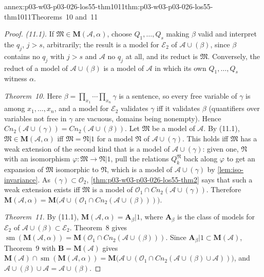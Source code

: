\begin{annexitem}{annex:p03-w03-p03-026-los55-thm1011}{thm:p03-w03-p03-026-los55-thm1011}{Theorems~10 and~11}
\begin{proof}
\emph{(11.1).}  If \(\mathfrak M\in\mathbf M(\mathcal A,\alpha)\), choose
\(Q_1,\ldots,Q_s\) making \(\beta\) valid and interpret the \(q_j\), \(j>s\),
arbitrarily; the result is a model for \(\mathcal E_2\) of
\(\mathcal A\cup(\beta)\), since \(\beta\) contains no \(q_j\) with \(j>s\)
and \(\mathcal A\) no \(q_j\) at all, and its reduct is \(\mathfrak M\).
Conversely, the reduct of a model of \(\mathcal A\cup(\beta)\) is a model of
\(\mathcal A\) in which its own \(Q_1,\ldots,Q_s\) witness \(\alpha\).

\emph{Theorem~10.}  Here \(\beta=\prod_{x_1}\cdots\prod_{x_n}\gamma\) is a
sentence, so every free variable of \(\gamma\) is among
\(x_1,\ldots,x_n\), and a model for \(\mathcal E_2\) validates \(\gamma\) iff
it validates \(\beta\) (quantifiers over variables not free in \(\gamma\)
are vacuous, domains being nonempty).  Hence
\(\mathit{Cn}_2(\mathcal A\cup(\gamma))=\mathit{Cn}_2(\mathcal A\cup(\beta))\).
Let \(\mathfrak M\) be a model of \(\mathcal A\).  By (11.1),
\(\mathfrak M\in\mathbf M(\mathcal A,\alpha)\) iff \(\mathfrak M=\mathfrak N|1\)
for a model \(\mathfrak N\) of \(\mathcal A\cup(\gamma)\).  This holds iff
\(\mathfrak M\) has a weak extension of the second kind that is a model of
\(\mathcal A\cup(\gamma)\): given one, \(\mathfrak N\) with an isomorphism
\(\varphi\colon\mathfrak M\to\mathfrak N|1\), pull the relations
\(Q_k^{\mathfrak N}\) back along \(\varphi\) to get an expansion of
\(\mathfrak M\) isomorphic to \(\mathfrak N\), which is a model of
\(\mathcal A\cup(\gamma)\) by \cref{lem:iso-invariance}.  As
\((\gamma)\subset\mathcal O_2\), \cref{thm:p03-w03-p03-026-los55-thm2} says
that such a weak extension exists iff \(\mathfrak M\) is a model of
\(\mathcal O_1\cap\mathit{Cn}_2(\mathcal A\cup(\gamma))\).  Therefore
\(\mathbf M(\mathcal A,\alpha)=\mathbf M\bigl(\mathcal A\cup(\mathcal O_1\cap\mathit{Cn}_2(\mathcal A\cup(\beta)))\bigr)\).

\emph{Theorem~11.}  By (11.1),
\(\mathbf M(\mathcal A,\alpha)=\mathbf A_\beta|1\), where \(\mathbf A_\beta\) is
the class of models for \(\mathcal E_2\) of
\(\mathcal A\cup(\beta)\subset\mathcal E_2\).  Theorem~8 gives
\(\operatorname{sm}(\mathbf M(\mathcal A,\alpha))=\mathbf M(\mathcal O_1\cap\mathit{Cn}_2(\mathcal A\cup(\beta)))\).
Since \(\mathbf A_\beta|1\subset\mathbf M(\mathcal A)\), Theorem~9 with
\(\mathbf B=\mathbf M(\mathcal A)\) gives
\(\mathbf M(\mathcal A)\cap\operatorname{sm}(\mathbf M(\mathcal A,\alpha))
=\mathbf M\bigl(\mathcal A\cup(\mathcal O_1\cap\mathit{Cn}_2(\mathcal A\cup(\beta)\cup\mathcal A))\bigr)\),
and \(\mathcal A\cup(\beta)\cup\mathcal A=\mathcal A\cup(\beta)\).
\end{proof}
\end{annexitem}

